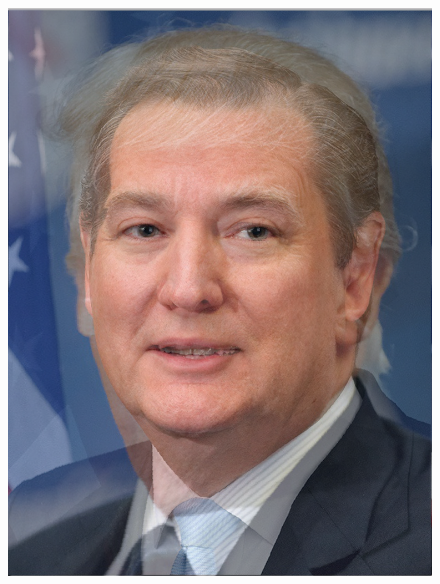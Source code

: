 \documentclass[a4paper]{article}
\begin{document}
\begin{figure}[htp]
{\begin{minipage}[b]{0.31\columnwidth}
{\includegraphics[width=1\columnwidth]{TC.png} 
}
\label{fig:3-5:b}
\end{minipage}
}
\hfil
{}
\end{figure}
\end{document}
